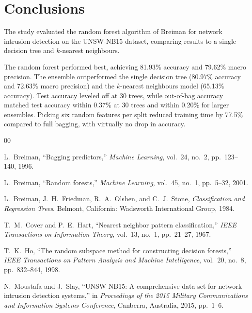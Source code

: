 \documentclass[conference,10pt]{IEEEtran}
\begin{document}
\balance
\section{Conclusions}

The study evaluated the random forest algorithm of Breiman \cite{breiman2001} for network intrusion detection on the UNSW-NB15 dataset, comparing results to a single decision tree and $k$-nearest neighbours.

The random forest performed best, achieving 81.93\% accuracy and 79.62\% macro precision. The ensemble outperformed the single decision tree (80.97\% accuracy and 72.63\% macro precision) and the $k$-nearest neighbours model (65.13\% accuracy). Test accuracy leveled off at 30 trees, while out-of-bag accuracy matched test accuracy within 0.37\% at 30 trees and within 0.20\% for larger ensembles. Picking six random features per split reduced training time by 77.5\% compared to full bagging, with virtually no drop in accuracy.

\begin{thebibliography}{00}
\setlength{\itemsep}{2.0pt}
\setlength{\parskip}{0pt}

L.~Breiman, ``Bagging predictors,'' \emph{Machine Learning}, vol.~24, no.~2, pp.~123--140, 1996.

L.~Breiman, ``Random forests,'' \emph{Machine Learning}, vol.~45, no.~1, pp.~5--32, 2001.

L.~Breiman, J.~H.~Friedman, R.~A.~Olshen, and C.~J.~Stone, \emph{Classification and Regression Trees}. Belmont, California: Wadsworth International Group, 1984.

T.~M.~Cover and P.~E.~Hart, ``Nearest neighbor pattern classification,'' \emph{IEEE Transactions on Information Theory}, vol.~13, no.~1, pp.~21--27, 1967.

T.~K.~Ho, ``The random subspace method for constructing decision forests,'' \emph{IEEE Transactions on Pattern Analysis and Machine Intelligence}, vol.~20, no.~8, pp.~832--844, 1998.

N.~Moustafa and J.~Slay, ``UNSW-NB15: A comprehensive data set for network intrusion detection systems,'' in \emph{Proceedings of the 2015 Military Communications and Information Systems Conference}, Canberra, Australia, 2015, pp.~1--6.

\end{thebibliography}
\end{document}
